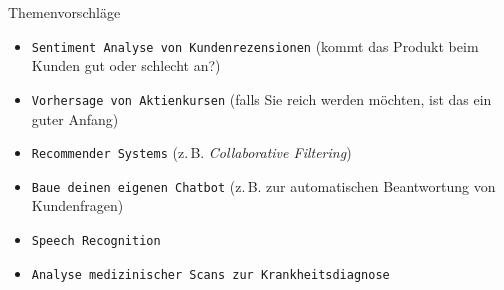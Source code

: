 \begin{dwHeaderFrame}{Themenvorschläge}
	\begin{itemize} 
		\item \texttt{Sentiment Analyse von Kundenrezensionen} (kommt das Produkt beim Kunden gut oder schlecht an?)
		\item \texttt{Vorhersage von Aktienkursen} (falls Sie reich werden möchten, ist das ein guter Anfang)
		\item \texttt{Recommender Systems} (z.\,B. \textit{Collaborative Filtering})
		\item \texttt{Baue deinen eigenen Chatbot} (z.\,B. zur automatischen Beantwortung von Kundenfragen)
		\item \texttt{Speech Recognition}
		\item \texttt{Analyse medizinischer Scans zur Krankheitsdiagnose}
	\end{itemize}
\end{dwHeaderFrame}


\makethanks

